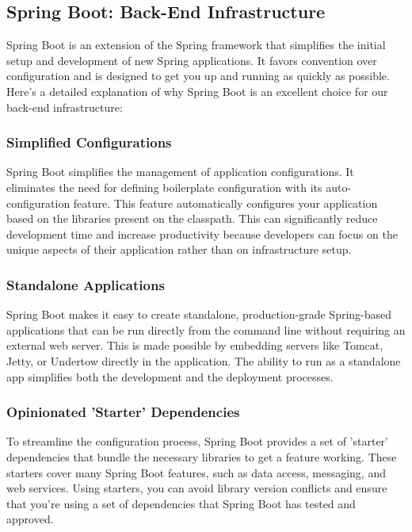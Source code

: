 \subsection{Spring Boot: Back-End Infrastructure}
Spring Boot is an extension of the Spring framework that simplifies the initial setup and development of new Spring applications. 
It favors convention over configuration and is designed to get you up and running as quickly as possible. Here's a detailed explanation of why Spring Boot is an excellent choice for our back-end infrastructure:

\subsubsection{Simplified Configurations} 

Spring Boot simplifies the management of application configurations. 
It eliminates the need for defining boilerplate configuration with its auto-configuration feature.
This feature automatically configures your application based on the libraries present on the classpath. 
This can significantly reduce development time and increase productivity because developers can focus on the unique aspects of their application rather than on infrastructure setup.

\subsubsection{Standalone Applications} 

Spring Boot makes it easy to create standalone, production-grade Spring-based applications that can be run directly from the command line without requiring an external web server. 
This is made possible by embedding servers like Tomcat, Jetty, or Undertow directly in the application. 
The ability to run as a standalone app simplifies both the development and the deployment processes.

\subsubsection{Opinionated 'Starter' Dependencies} 

To streamline the configuration process, Spring Boot provides a set of 'starter' dependencies that bundle the necessary libraries to get a feature working. 
These starters cover many Spring Boot features, such as data access, messaging, and web services. 
Using starters, you can avoid library version conflicts and ensure that you're using a set of dependencies that Spring Boot has tested and approved.

